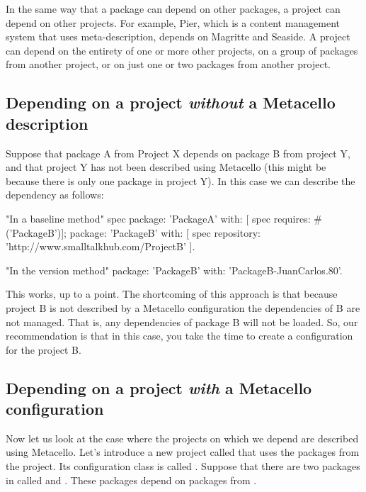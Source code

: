\documentclass[a4paper,10pt,twoside]{book}
\begin{document}
In the same way that a package can depend on other packages, a project can depend on other projects.  For example, Pier, which is a content management system that uses meta-description, depends on Magritte and Seaside.  A project can depend on the entirety of one or more other projects, on a group of packages from another project, or on just one or two packages from another project.

\subsection{Depending on a project \emph{without} a Metacello description}

Suppose that package A from Project X depends on package B from project Y, and that project Y has not been described using Metacello (this might be because there is only one package in project Y). 
In this case we can describe the dependency as follows:

\begin{code}{}
      "In a baseline method"
      spec 
             package: 'PackageA' with: [  spec requires: #('PackageB')];
             package: 'PackageB' with: [  spec 
                   repository: 'http://www.smalltalkhub.com/ProjectB' ].       
\end{code}

\begin{code}{}
      "In the version method"
      package: 'PackageB' with: 'PackageB-JuanCarlos.80'.
\end{code}

This works, up to a point.  The shortcoming of this approach is that because  project B is not described by a Metacello configuration the dependencies of B are not managed. 
That is, any dependencies of package B will not be loaded. So, our recommendation is that in this case, you take the time to create a configuration for the project B.

\subsection{Depending on a project \emph{with} a Metacello configuration}
Now let us look at the case where the projects on which we depend are described using Metacello.
Let's introduce a new project called  that uses the packages from the  project.  Its configuration class is called .   Suppose that there are two packages in  called  and . These packages depend on packages from . 
\end{document}
